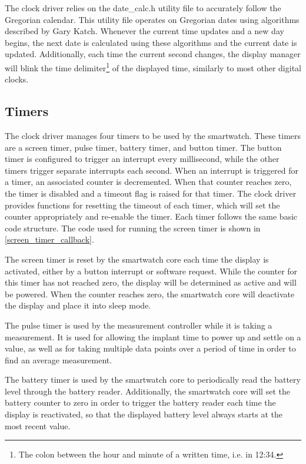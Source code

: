 The clock driver relies on the date\_calc.h utility file to accurately follow the Gregorian calendar. This utility file operates on Gregorian dates using algorithms described by Gary Katch\cite{datecalc}. Whenever the current time updates and a new day begins, the next date is calculated using these algorithms and the current date is updated. Additionally, each time the current second changes, the display manager will blink the time delimiter\footnote{The colon between the hour and minute of a written time, i.e. in 12:34.} of the displayed time, similarly to most other digital clocks.

\subsection{Timers}
The clock driver manages four timers to be used by the smartwatch. These timers are a screen timer, pulse timer, battery timer, and button timer. The button timer is configured to trigger an interrupt every millisecond, while the other timers trigger separate interrupts each second. When an interrupt is triggered for a timer, an associated counter is decremented. When that counter reaches zero, the timer is disabled and a timeout flag is raised for that timer. The clock driver provides functions for resetting the timeout of each timer, which will set the counter appropriately and re-enable the timer. Each timer follows the same basic code structure. The code used for running the screen timer is shown in \ref{screen_timer_callback}.

The screen timer is reset by the smartwatch core each time the display is activated, either by a button interrupt or software request. While the counter for this timer has not reached zero, the display will be determined as active and will be powered. When the counter reaches zero, the smartwatch core will deactivate the display and place it into sleep mode.

The pulse timer is used by the measurement controller while it is taking a measurement. It is used for allowing the implant time to power up and settle on a value, as well as for taking multiple data points over a period of time in order to find an average measurement.

The battery timer is used by the smartwatch core to periodically read the battery level through the battery reader. Additionally, the smartwatch core will set the battery counter to zero in order to trigger the battery reader each time the display is reactivated, so that the displayed battery level always starts at the most recent value.

